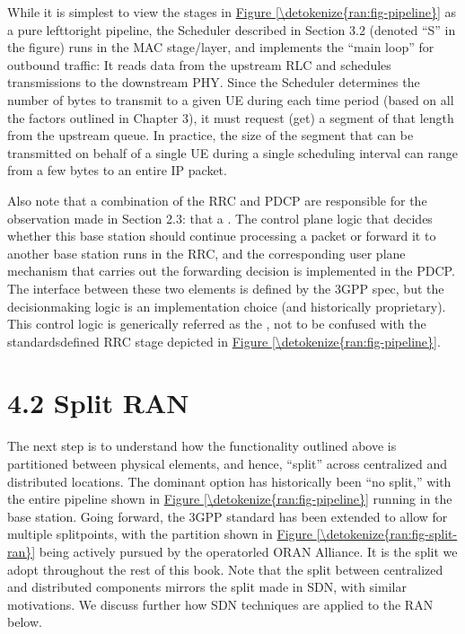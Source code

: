 \documentclass[a4paper,11pt,english]{sphinxmanual}
\begin{document}
\sphinxAtStartPar
While it is simplest to view the stages in \hyperref[\detokenize{ran:fig-pipeline}]{Figure \ref{\detokenize{ran:fig-pipeline}}} as a pure left\sphinxhyphen{}to\sphinxhyphen{}right pipeline, the Scheduler
described in Section 3.2 (denoted “S” in the figure) runs in the MAC
stage/layer, and implements the “main loop” for outbound traffic:
It reads data from the upstream RLC and schedules transmissions to the
downstream PHY. Since the Scheduler determines the number of bytes to
transmit to a given UE during each time period (based on all the
factors outlined in Chapter 3), it must request (get) a segment of
that length from the upstream queue. In practice, the size of the
segment that can be transmitted on behalf of a single UE during a
single scheduling interval can range from a few bytes to an entire IP
packet.

\sphinxAtStartPar
Also note that a combination of the RRC and PDCP are responsible for
the observation made in Section 2.3: that a . The control plane logic that
decides whether this base station should continue processing a packet
or forward it to another base station runs in the RRC, and the
corresponding user plane mechanism that carries out the forwarding
decision is implemented in the PDCP. The interface between these two
elements is defined by the 3GPP spec, but the decision\sphinxhyphen{}making logic is
an implementation choice (and historically proprietary). This control
logic is generically referred as the , not to be confused with the standards\sphinxhyphen{}defined RRC stage
depicted in \hyperref[\detokenize{ran:fig-pipeline}]{Figure \ref{\detokenize{ran:fig-pipeline}}}.


\section{4.2 Split RAN}
\label{\detokenize{ran:split-ran}}
\sphinxAtStartPar
The next step is to understand how the functionality outlined above is
partitioned between physical elements, and hence, “split” across
centralized and distributed locations. The dominant option has
historically been “no split,” with the entire pipeline shown in
\hyperref[\detokenize{ran:fig-pipeline}]{Figure \ref{\detokenize{ran:fig-pipeline}}} running in the base station. Going
forward, the 3GPP standard has been extended to allow for multiple
split\sphinxhyphen{}points, with the partition shown in \hyperref[\detokenize{ran:fig-split-ran}]{Figure \ref{\detokenize{ran:fig-split-ran}}} being actively pursued by the operator\sphinxhyphen{}led O\sphinxhyphen{}RAN
Alliance. It is the split we adopt throughout the rest of this
book. Note that the split between centralized and distributed
components mirrors the split made in SDN, with similar motivations. We
discuss further how SDN techniques are applied to the RAN below.
\end{document}
